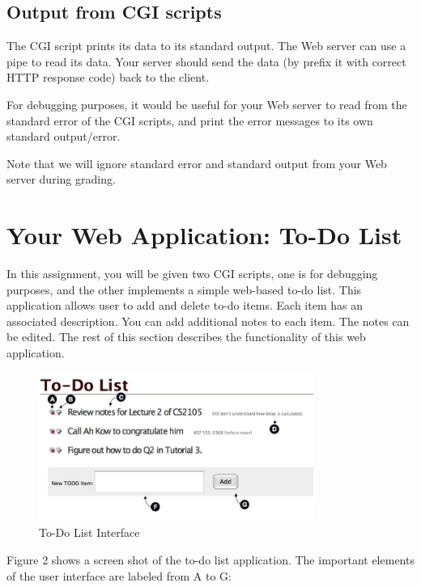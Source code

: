 \documentclass[a4paper,11pt]{exam}
\begin{document}
\subsection*{Output from CGI scripts}

The CGI script prints its data to its standard output. The Web server can use a pipe to read its data. Your server should send the data (by prefix it with correct HTTP response code) back to the client.

For debugging purposes, it would be useful for your Web server to read from the standard error of the CGI scripts, and print the error messages to its own standard output/error.

Note that we will ignore standard error and standard output from your Web server during grading.

\section*{Your Web Application: To-Do List}

In this assignment, you will be given two CGI scripts, one is for debugging purposes, and the other implements a simple web-based to-do list. This application allows user to add and delete to-do items. Each item has an associated description. You can add additional notes to each item. The notes can be edited. The rest of this section describes the functionality of this web application.

\begin{figure}
\begin{center}
	\includegraphics[width=0.8\textwidth]{todo-list.jpg}
\end{center}
\caption{To-Do List Interface}
\end{figure}

Figure 2 shows a screen shot of the to-do list application. The important elements of the user interface are labeled from A to G:
\end{document}
